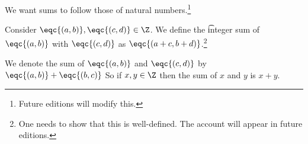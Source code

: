 

We want sums to follow those of natural numbers.\footnote{Future editions will modify this.}


Consider $\eqc{(a, b)}, \eqc{(c, d)} \in \Z$.
We define the \t{integer sum} of $\eqc{(a, b)}$ with $\eqc{(c, d)}$ as $\eqc{(a + c, b + d)}$.\footnote{One needs to show that this is well-defined. The account will appear in future editions.}


We denote the sum of $\eqc{(a, b)}$ and $\eqc{(c, d)}$ by $\eqc{(a, b)} + \eqc{(b, c)}$
So if $x, y \in \Z$ then the sum of $x$ and $y$ is $x + y$.

\blankpage

